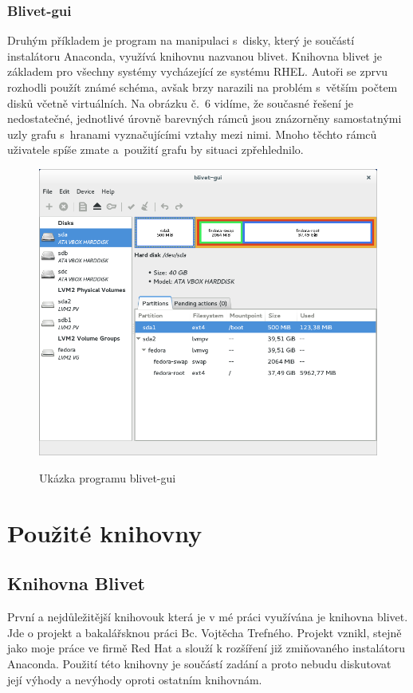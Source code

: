 \documentclass[color,table,oneside,nolot,nolof]{fithesis}
\begin{document}
 \subsection{Blivet-gui}

 Druhým příkladem je program na manipulaci s~disky, který je součástí instalátoru Anaconda, využívá knihovnu nazvanou blivet. Knihovna blivet je základem pro všechny systémy vycházející ze systému RHEL. Autoři 
 se zprvu rozhodli použít známé schéma, avšak brzy narazili na problém s~větším počtem disků včetně virtuálních. Na obrázku č.~6 vidíme, že současné řešení je nedostatečné, jednotlivé úrovně barevných rámců 
 jsou znázorněny samostatnými uzly grafu s~hranami vyznačujícími vztahy mezi nimi. Mnoho těchto rámců uživatele spíše zmate a~použití grafu by situaci zpřehlednilo.

 \begin{figure}[h!]
	 \label{fig:blivet}
	 \caption{Ukázka programu blivet-gui~\cite{blivet-gui}}
	 \centering
	 \includegraphics[width=.6\columnwidth]{pictures/blivet-gui-1.png}\\
 \end{figure}

\chapter{Použité knihovny}
\section{Knihovna Blivet}
	První a nejdůležitější knihovouk která je v mé práci využívána je knihovna blivet. Jde o projekt a bakalářsknou práci Bc. Vojtěcha Trefného. Projekt vznikl, stejně jako moje
	práce ve firmě Red Hat a slouží k rozšíření již zmiňovaného instalátoru Anaconda. Použití této knihovny je součástí zadání a proto nebudu diskutovat její výhody a nevýhody
	oproti ostatním knihovnám. 
\end{document}
